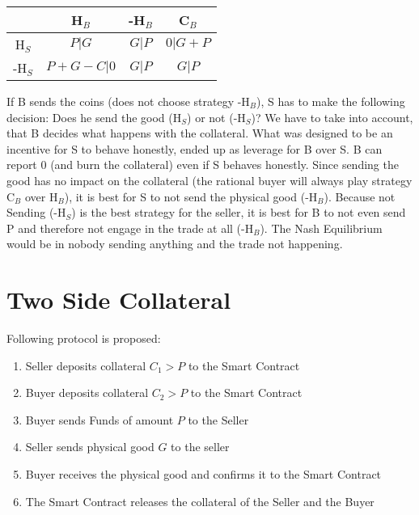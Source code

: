 \documentclass{cacthesis}
\begin{document}

\begin{center}
\begin{tabular}{ c||c|c|c| }
& H$_B$ & -H$_B$ & C$_B$  \\
\hline
\hline
H$_S$ & $P | G$ & $G | P$ & $0 | G + P$ \\
\hline
-H$_S$ & $P + G - C | 0$ & $G | P$ & $G | P$ \\ 
\hline
\end{tabular}
\end{center}
If B sends the coins (does not choose strategy -H$_B$), S has to make the following decision: Does he send the good (H$_S$) or not (-H$_S$)? We have to take into account, that B decides what happens with the collateral. \newline
What was designed to be an incentive for S to behave honestly, ended up as leverage for B over S. B can report 0 (and burn the collateral) even if S behaves honestly. 
Since sending the good has no impact on the collateral (the rational buyer will always play strategy C$_B$ over H$_B$), it is best for S to not send the physical good (-H$_B$).
Because not Sending (-H$_S$) is the best strategy for the seller, it is best for B to not even send P and therefore not engage in the trade at all (-H$_B$).\newline
The Nash Equilibrium would be in nobody sending anything and the trade not happening.



\section{Two Side Collateral}
Following protocol is proposed:
\begin{enumerate}
    \item Seller  deposits collateral $C_1 > P$ to the Smart Contract
    \item Buyer  deposits collateral $C_2 > P$ to the Smart Contract
    \item Buyer sends Funds of amount $P$ to the Seller
    \item Seller sends physical good $G$ to the seller 
    \item Buyer receives the physical good and confirms it to the Smart Contract
    \item The Smart Contract releases the collateral of the Seller and the Buyer
\end{enumerate}
\end{document}
